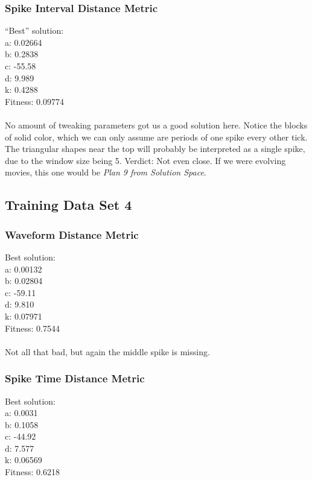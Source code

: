 \documentclass[a4paper,12pt]{article}
\begin{document}
\subsubsection{Spike Interval Distance Metric}
``Best'' solution: \\
a: 0.02664 \\
b: 0.2838 \\
c: -55.58 \\
d: 9.989 \\
k: 0.4288 \\
Fitness: 0.09774
\paragraph{}No amount of tweaking parameters got us a good solution here. Notice the blocks of solid color, which we can only assume are periods of one spike every other tick. The triangular shapes near the top will probably be interpreted as a single spike, due to the window size being 5. Verdict: Not even close. If we were evolving movies, this one would be \textit{Plan 9 from Solution Space}.

\subsection{Training Data Set 4}
\subsubsection{Waveform Distance Metric}
Best solution: \\
a: 0.00132 \\
b: 0.02804 \\
c: -59.11 \\
d: 9.810 \\
k: 0.07971 \\
Fitness: 0.7544
\paragraph{}Not all that bad, but again the middle spike is missing.

\subsubsection{Spike Time Distance Metric}
Best solution: \\
a: 0.0031 \\
b: 0.1058 \\
c: -44.92 \\
d: 7.577 \\
k: 0.06569 \\
Fitness: 0.6218
\end{document}
